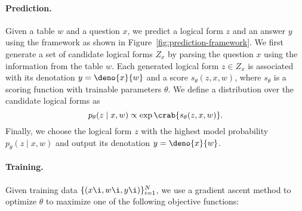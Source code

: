 \paragraph{Prediction.}
Given a table $w$ and a question $x$,
we predict a logical form $z$ and an answer $y$ using the framework
as shown in Figure~\ref{fig:prediction-framework}.
We first generate a set of candidate logical forms
$Z_x$ by parsing the question $x$ using the information
from the table $w$.
Each generated logical form $z \in Z_x$
is associated with its denotation $y = \deno{x}{w}$
and a score $s_\theta(z, x, w)$,
where $s_\theta$ is a scoring function
with trainable parameters $\theta$.
We define a distribution over the candidate logical forms as
\begin{equation}
p_\theta(z \mid x, w) \propto \exp\crab{s_\theta(z, x, w)}.
\end{equation}
Finally, we choose the logical form $z$ with the highest
model probability $p_\theta(z \mid x, w)$
and output its denotation $y = \deno{x}{w}$.

\paragraph{Training.}
Given training data $\{(x\i, w\i, y\i)\}_{i=1}^N$,
we use a gradient ascent method to optimize $\theta$ to maximize
one of the following objective functions:

